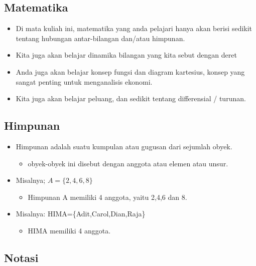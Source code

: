 \documentclass[
  letterpaper,
  DIV=11,
  numbers=noendperiod]{scrartcl}
\providecommand{\tightlist}{%
  \setlength{\itemsep}{0pt}\setlength{\parskip}{0pt}}\usepackage{longtable,booktabs,array}
\begin{document}
\hypertarget{matematika-1}{%
\subsection{Matematika}\label{matematika-1}}

\begin{itemize}
\item
  Di mata kuliah ini, matematika yang anda pelajari hanya akan berisi
  sedikit tentang hubungan antar-bilangan dan/atau himpunan.
\item
  Kita juga akan belajar dinamika bilangan yang kita sebut dengan deret
\item
  Anda juga akan belajar konsep fungsi dan diagram kartesius, konsep
  yang sangat penting untuk menganalisis ekonomi.
\item
  Kita juga akan belajar peluang, dan sedikit tentang differensial /
  turunan.
\end{itemize}

\hypertarget{himpunan}{%
\subsection{Himpunan}\label{himpunan}}

\begin{itemize}
\item
  Himpunan adalah suatu kumpulan atau gugusan dari sejumlah obyek.

  \begin{itemize}
  \tightlist
  \item
    obyek-obyek ini disebut dengan anggota atau elemen atau unsur.
  \end{itemize}
\item
  Misalnya; \(A=\{2,4,6,8\}\)

  \begin{itemize}
  \tightlist
  \item
    Himpunan A memiliki 4 anggota, yaitu 2,4,6 dan 8.
  \end{itemize}
\item
  Misalnya: HIMA=\{Adit,Carol,Dian,Raja\}

  \begin{itemize}
  \tightlist
  \item
    HIMA memiliki 4 anggota.
  \end{itemize}
\end{itemize}

\hypertarget{notasi}{%
\subsection{Notasi}\label{notasi}}
\end{document}
